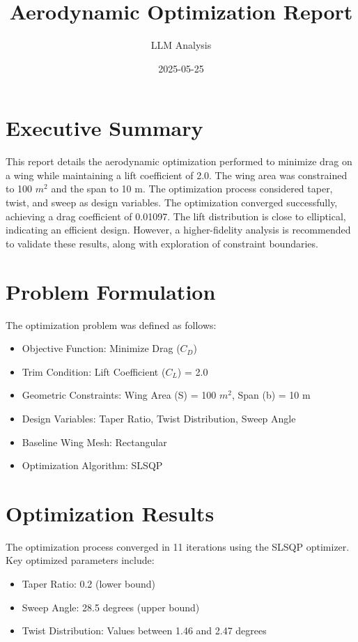 \documentclass{article}
\title{Aerodynamic Optimization Report}
\author{LLM Analysis}
\date{2025-05-25}
\begin{document}
\maketitle

\section{Executive Summary}
This report details the aerodynamic optimization performed to minimize drag on a wing while maintaining a lift coefficient of 2.0. The wing area was constrained to 100 $m^2$ and the span to 10 m. The optimization process considered taper, twist, and sweep as design variables. The optimization converged successfully, achieving a drag coefficient of 0.01097. The lift distribution is close to elliptical, indicating an efficient design. However, a higher-fidelity analysis is recommended to validate these results, along with exploration of constraint boundaries.

\section{Problem Formulation}
The optimization problem was defined as follows:
\begin{itemize}
    \item Objective Function: Minimize Drag ($C_D$)
    \item Trim Condition: Lift Coefficient ($C_L$) = 2.0
    \item Geometric Constraints: Wing Area (S) = 100 $m^2$, Span (b) = 10 m
    \item Design Variables: Taper Ratio, Twist Distribution, Sweep Angle
    \item Baseline Wing Mesh: Rectangular
    \item Optimization Algorithm: SLSQP
\end{itemize}

\section{Optimization Results}
The optimization process converged in 11 iterations using the SLSQP optimizer. Key optimized parameters include:
\begin{itemize}
    \item Taper Ratio: 0.2 (lower bound)
    \item Sweep Angle: 28.5 degrees (upper bound)
    \item Twist Distribution: Values between 1.46 and 2.47 degrees
\end{itemize}
\end{document}
